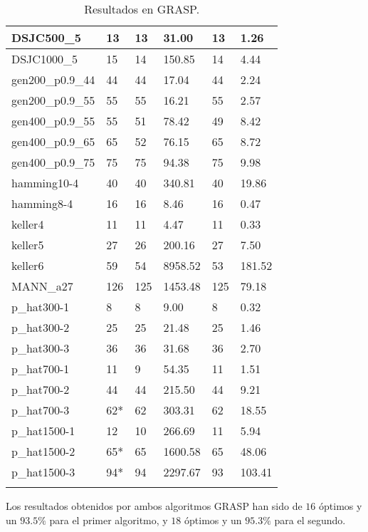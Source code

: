 \begin{small}
\begin{longtable}{l l l l l l}
    DSJC500\_5         & 13 & 13 & 31.00 & 13 & 1.26\\ \hline
    DSJC1000\_5        & 15 & 14 & 150.85 & 14 & 4.44\\ \hline
    gen200\_p0.9\_44   & 44 & 44 & 17.04 & 44 & 2.24\\ \hline
    gen200\_p0.9\_55   & 55 & 55 & 16.21 & 55 & 2.57\\ \hline
    gen400\_p0.9\_55   & 55 & 51 & 78.42 & 49 & 8.42\\ \hline
    gen400\_p0.9\_65   & 65 & 52 & 76.15 & 65 & 8.72\\ \hline
    gen400\_p0.9\_75   & 75 & 75 & 94.38 & 75 & 9.98\\ \hline
    hamming10-4        & 40 & 40 & 340.81 & 40 & 19.86\\ \hline
    hamming8-4         & 16 & 16 & 8.46 & 16 & 0.47\\ \hline
    keller4            & 11 & 11 & 4.47 & 11 & 0.33\\ \hline
    keller5            & 27 & 26 & 200.16 & 27 & 7.50\\ \hline
    keller6            & 59 & 54 & 8958.52 & 53 & 181.52\\ \hline
    MANN\_a27          & 126 & 125 & 1453.48 & 125 & 79.18\\ \hline
    p\_hat300-1        & 8 & 8 & 9.00 & 8 & 0.32\\ \hline
    p\_hat300-2        & 25 & 25 & 21.48 & 25 & 1.46\\ \hline
    p\_hat300-3        & 36 & 36 & 31.68 & 36 & 2.70\\ \hline
    p\_hat700-1        & 11 & 9 & 54.35 & 11 & 1.51\\ \hline
    p\_hat700-2        & 44 & 44 & 215.50 & 44 & 9.21\\ \hline
    p\_hat700-3        & 62* & 62 & 303.31 & 62 & 18.55\\ \hline
    p\_hat1500-1       & 12 & 10 & 266.69 & 11 & 5.94 \\ \hline
    p\_hat1500-2       & 65* & 65 & 1600.58 & 65 & 48.06\\ \hline
    p\_hat1500-3       & 94* & 94 & 2297.67 & 93 & 103.41\\ \hline
  \caption{Resultados en GRASP.}
\end{longtable}
\end{small}

Los resultados obtenidos por ambos algoritmos GRASP han sido de $16$ óptimos y un
$93.5\%$ para el primer algoritmo, y $18$ óptimos y un $95.3\%$ para el segundo.

